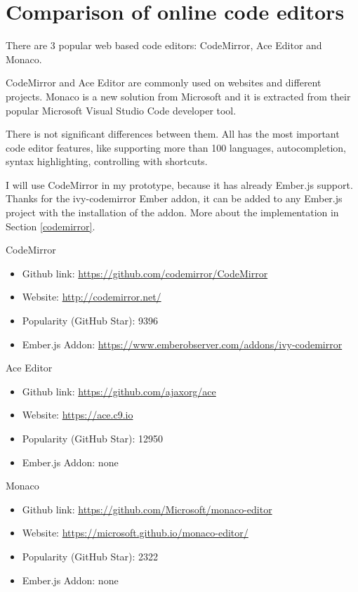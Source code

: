\documentclass[12pt, a4paper, oneside, openright, medskipamount]{report}
\begin{document}
\section{Comparison of online code editors} \label{comparision}

There are 3 popular web based code editors: CodeMirror, Ace Editor and Monaco.

CodeMirror and Ace Editor are commonly used on websites and different projects. Monaco is a new solution from Microsoft and it is extracted from their popular Microsoft Visual Studio Code developer tool.

There is not significant differences between them. All has the most important code editor features, like supporting more than 100 languages, autocompletion, syntax highlighting, controlling with shortcuts.

I will use CodeMirror in my prototype, because it has already Ember.js support. Thanks for the ivy-codemirror Ember addon, it can be added to any Ember.js project with the installation of the addon. More about the implementation in Section \ref{codemirror}.

\noindent CodeMirror
\begin{itemize}[noitemsep]
\item Github link: \url{https://github.com/codemirror/CodeMirror}
\item Website: \url{http://codemirror.net/}
\item Popularity (GitHub Star): 9396
\item Ember.js Addon: \url{https://www.emberobserver.com/addons/ivy-codemirror}
\end{itemize}

\noindent Ace Editor
\begin{itemize}[noitemsep]
\item Github link: \url{https://github.com/ajaxorg/ace}
\item Website: \url{https://ace.c9.io}
\item Popularity (GitHub Star): 12950
\item Ember.js Addon: none
\end{itemize}

\noindent Monaco
\begin{itemize}[noitemsep]
\item Github link: \url{https://github.com/Microsoft/monaco-editor}
\item Website: \url{https://microsoft.github.io/monaco-editor/}
\item Popularity (GitHub Star): 2322
\item Ember.js Addon: none
\end{itemize}
\end{document}
